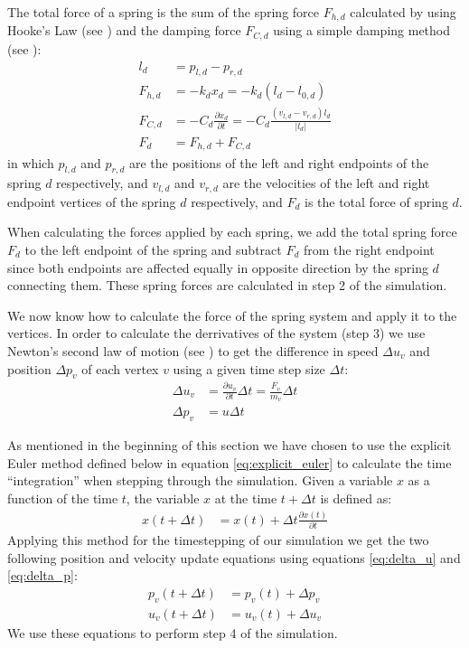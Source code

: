 \documentclass[11pt]{article}
\providecommand{\abs}[1]{\left \lvert #1 \right \rvert}
\begin{document}
The total force of a spring is the sum of the spring force $F_{h,d}$
calculated by using Hooke's Law (see \cite[p.~439]{Young:2010})
and the damping force $F_{C,d}$ using a simple damping method (see
\cite[p.~457]{Young:2010}): \begin{align} \nonumber l_d &= p_{l,d} -
p_{r,d} \\ \label{eq:hooke} F_{h,d} &= -k_d x_d = -k_d (l_d - l_{0,d}) \\
\label{eq:damping} F_{C,d} &= -C_d \frac{\partial x_d}{ \partial t} = - C_d
\frac{\left(v_{l,d} - v_{r,d}\right) l_d}{\abs{l_d}} \\ F_d &= F_{h,d} +
F_{C,d} \end{align} \todo{Maybe add direction correction: $F_d \cdot (-l_d
/ \abs{l_d})$} in which $p_{l,d}$ and $p_{r,d}$ are the positions of the
left and right endpoints of the spring $d$ respectively, and $v_{l,d}$ and
$v_{r,d}$ are the velocities of the left and right endpoint vertices of the
spring $d$ respectively, and $F_d$ is the total force of spring $d$.

When calculating the forces applied by each spring, we add the total spring
force $F_d$ to the left endpoint of the spring and subtract $F_d$ from the
right endpoint since both endpoints are affected equally in opposite direction
by the spring $d$ connecting them. These spring forces are calculated in step
2 of the simulation.

We now know how to calculate the force of the spring system and apply it to
the vertices. In order to calculate the derrivatives of the system (step 3) we
use Newton's second law of motion (see \cite[p.~112-115]{Young:2010}) to get
the difference in speed $\Delta u_v$ and position $\Delta p_v$ of each vertex
$v$ using a given time step size $\Delta t$: \begin{align} \label{eq:delta_u}
\Delta u_v &= \frac{\partial u_v}{\partial t} \Delta t = \frac{F_v}{m_v}
\Delta t \\ \label{eq:delta_p} \Delta p_v &= u \Delta t \end{align}

As mentioned in the beginning of this section we have chosen to use the
explicit Euler method defined below in equation \ref{eq:explicit_euler}
to calculate the time ``integration'' \cite{Flaherty} when stepping through
the simulation. Given a variable $x$ as a function of the time $t$, the
variable $x$ at the time $t + \Delta t$ is defined as: \begin{align}
\label{eq:explicit_euler} x(t+\Delta t) &= x(t) + \Delta t \frac{\partial
x(t)}{\partial t} \end{align} Applying this method for the timestepping
of our simulation we get the two following position and velocity update
equations using equations \ref{eq:delta_u} and \ref{eq:delta_p}: \begin{align}
p_v(t+\Delta t) &= p_v(t) + \Delta p_v \\ u_v(t+\Delta t) &= u_v(t) + \Delta
u_v \end{align} We use these equations to perform step 4 of the simulation.
\end{document}

